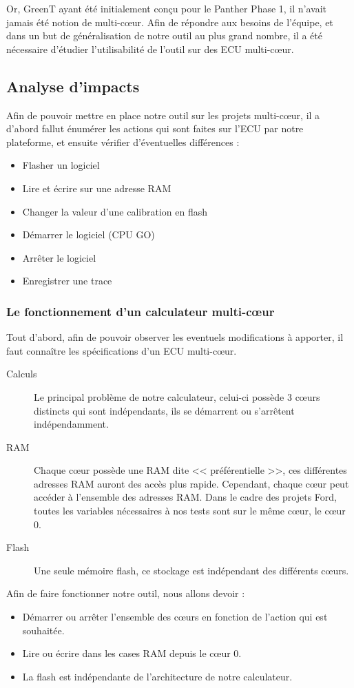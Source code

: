 Or, GreenT ayant été initialement conçu pour le Panther Phase 1, il n'avait jamais été notion de multi-cœur. Afin de répondre aux besoins de l'équipe, et dans un but de généralisation de notre outil au plus grand nombre, il a été nécessaire d'étudier l'utilisabilité de l'outil sur des ECU multi-cœur.

\subsection{Analyse d'impacts}\label{analyseimpact}
Afin de pouvoir mettre en place notre outil sur les projets multi-cœur, il a d'abord fallut énumérer les actions qui sont faites sur l'ECU par notre plateforme, et ensuite vérifier d'éventuelles différences : 
\begin{itemize}
	\item Flasher un logiciel
	\item Lire et écrire sur une adresse RAM
	\item Changer la valeur d'une calibration en flash
	\item Démarrer le logiciel (CPU GO)
	\item Arrêter le logiciel
	\item Enregistrer une trace
\end{itemize}


\subsubsection{Le fonctionnement d'un calculateur multi-cœur}
Tout d'abord, afin de pouvoir observer les eventuels modifications à apporter, il faut connaître les spécifications d'un ECU multi-cœur. 
\begin{description}
	\item[Calculs] Le principal problème de notre calculateur, celui-ci possède 3 cœurs distincts qui sont indépendants, ils se démarrent ou s'arrêtent indépendamment. 
	\item[RAM] Chaque c\oe{}ur possède une RAM dite << préférentielle >>, ces différentes adresses RAM auront des accès plus rapide. Cependant, chaque cœur peut accéder à l'ensemble des adresses RAM. Dans le cadre des projets Ford, toutes les variables nécessaires à nos tests sont sur le même c\oe{}ur, le c\oe{}ur 0. 
	\item[Flash] Une seule mémoire flash, ce stockage est indépendant des différents c\oe{}urs. 
\end{description}

Afin de faire fonctionner notre outil, nous allons devoir : 
\begin{itemize}
	\item Démarrer ou arrêter l'ensemble des c\oe{}urs en fonction de l'action qui est souhaitée.
	\item Lire ou écrire dans les cases RAM depuis le c\oe{}ur 0.
	\item La flash est indépendante de l'architecture de notre calculateur.\\
\end{itemize}

